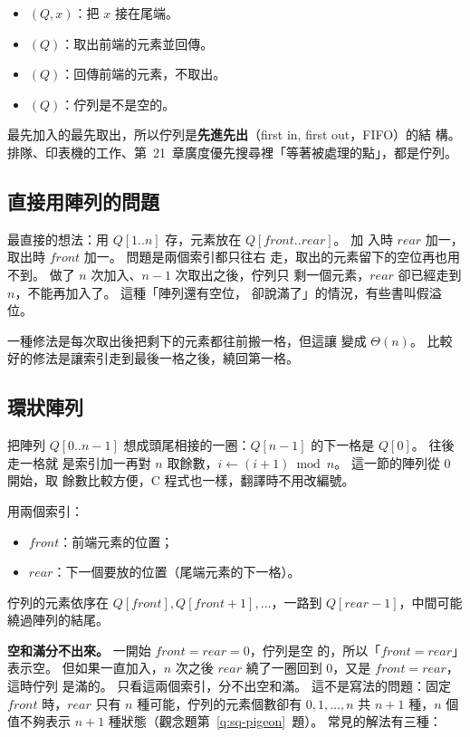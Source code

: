 \begin{itemize}
\item {}$(Q, x)$：把 $x$ 接在尾端。
\item {}$(Q)$：取出前端的元素並回傳。
\item {}$(Q)$：回傳前端的元素，不取出。
\item {}$(Q)$：佇列是不是空的。
\end{itemize}

最先加入的最先取出，所以佇列是\textbf{先進先出}（first in, first out，FIFO）的結
構。 排隊、印表機的工作、第~21~章廣度優先搜尋裡「等著被處理的點」，都是佇列。

\subsection{直接用陣列的問題}

最直接的想法：用 $Q[1..n]$ 存，元素放在 $Q[\mathit{front}..\mathit{rear}]$。 加
入時 $\mathit{rear}$ 加一，取出時 $\mathit{front}$ 加一。 問題是兩個索引都只往右
走，取出的元素留下的空位再也用不到。 做了 $n$ 次加入、$n - 1$ 次取出之後，佇列只
剩一個元素，$\mathit{rear}$ 卻已經走到 $n$，不能再加入了。 這種「陣列還有空位，
卻說滿了」的情況，有些書叫假溢位。

一種修法是每次取出後把剩下的元素都往前搬一格，但這讓  變成
$\Theta(n)$。 比較好的修法是讓索引走到最後一格之後，繞回第一格。

\subsection{環狀陣列}
\label{sec:sq-circular}

把陣列 $Q[0..n-1]$ 想成頭尾相接的一圈：$Q[n-1]$ 的下一格是 $Q[0]$。 往後走一格就
是索引加一再對 $n$ 取餘數，$i \gets (i + 1) \bmod n$。 這一節的陣列從 $0$ 開始，取
餘數比較方便，C 程式也一樣，翻譯時不用改編號。

用兩個索引：
\begin{itemize}
\item $\mathit{front}$：前端元素的位置；
\item $\mathit{rear}$：下一個要放的位置（尾端元素的下一格）。
\end{itemize}
佇列的元素依序在 $Q[\mathit{front}], Q[\mathit{front} + 1], \ldots$，一路到
$Q[\mathit{rear} - 1]$，中間可能繞過陣列的結尾。

\textbf{空和滿分不出來。} 一開始 $\mathit{front} = \mathit{rear} = 0$，佇列是空
的，所以「$\mathit{front} = \mathit{rear}$」表示空。 但如果一直加入，$n$ 次之後
$\mathit{rear}$ 繞了一圈回到 $0$，又是 $\mathit{front} = \mathit{rear}$，這時佇列
是滿的。 只看這兩個索引，分不出空和滿。 這不是寫法的問題：固定 $\mathit{front}$
時，$\mathit{rear}$ 只有 $n$ 種可能，佇列的元素個數卻有 $0, 1, \ldots, n$ 共
$n + 1$ 種，$n$ 個值不夠表示 $n + 1$ 種狀態（觀念題第~\ref{q:sq-pigeon}~題）。 常見的解法有三種：


